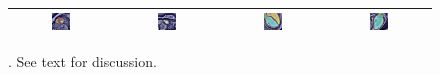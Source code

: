 \begin{figure}
\begin{center}
\begin{tabular}{cccc}
\includegraphics[width=0.19\textwidth]{./data/failures/HCMNet_2000062/00_SAX/9/9_gt.png} &
\includegraphics[width=0.19\textwidth]{./data/failures/HCMNet_2400044/00_SAX/2/5_gt.png} &
\includegraphics[width=0.19\textwidth]{./data/failures/HCMNet_2600079/01_HLA/00/0_gt.png} &
\includegraphics[width=0.19\textwidth]{./data/failures/HCMNet_2600079/02_VLA/00/0_gt.png} \\
\bottomrule

\end{tabular}

\caption[\captiontitle]{\captiontitle{}.  See text for discussion.}
\label{fig:failure}
\end{center}
\end{figure}
